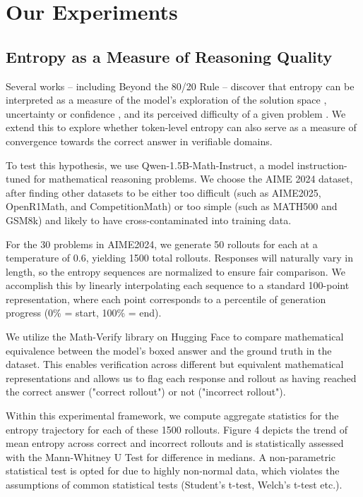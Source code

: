 \documentclass{article}
\begin{document}
\section{Our Experiments}

\subsection{Entropy as a Measure of Reasoning Quality}

Several works -- including Beyond the 80/20 Rule -- discover that entropy can be interpreted as a measure of the model's exploration of the solution space \cite{wang_beyond_2025}, uncertainty or confidence \cite{zhu_uncertainty_2025}, and its perceived difficulty of a given problem \cite{scalena_eager_2025}. We extend this to explore whether token-level entropy can also serve as a measure of convergence towards the correct answer in verifiable domains.

To test this hypothesis, we use Qwen-1.5B-Math-Instruct, a model instruction-tuned for mathematical reasoning problems. We choose the AIME 2024 dataset, after finding other datasets to be either too difficult (such as AIME2025, OpenR1Math, and CompetitionMath) or too simple (such as MATH500 and GSM8k) and likely to have cross-contaminated into training data.

For the 30 problems in AIME2024, we generate 50 rollouts for each at a temperature of $0.6$, yielding 1500 total rollouts. Responses will naturally vary in length, so the entropy sequences are normalized to ensure fair comparison. We accomplish this by linearly interpolating each sequence to a standard 100-point representation, where each point corresponds to a percentile of generation progress (0\% = start, 100\% = end).

We utilize the Math-Verify library on Hugging Face to compare mathematical equivalence between the model's boxed answer and the ground truth in the dataset. This enables verification across different but equivalent mathematical representations and allows us to flag each response and rollout as having reached the correct answer ("correct rollout") or not ("incorrect rollout").

Within this experimental framework, we compute aggregate statistics for the entropy trajectory for each of these 1500 rollouts. Figure 4 depicts the trend of mean entropy across correct and incorrect rollouts and is statistically assessed with the Mann-Whitney U Test for difference in medians. A non-parametric statistical test is opted for due to highly non-normal data, which violates the assumptions of common statistical tests (Student’s t-test, Welch’s t-test etc.).
\end{document}
